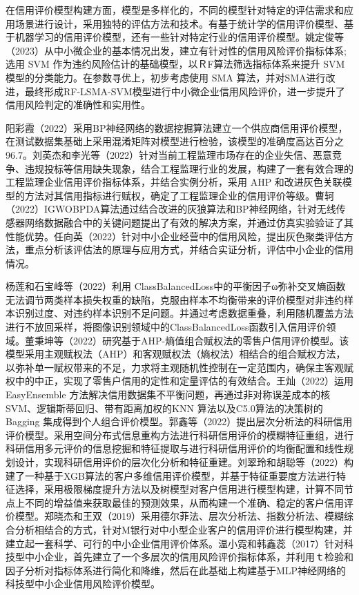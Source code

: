  
在信用评价模型构建方面，模型是多样化的，不同的模型针对特定的评估需求和应用场景进行设计，采用独特的评估方法和技术。有基于统计学的信用评价模型、基于机器学习的信用评价模型，还有一些针对特定行业的信用评价模型。姚定俊等（2023）从中小微企业的基本情况出发，建立有针对性的信用风险评价指标体系; 选用 SVM 作为违约风险估计的基础模型，以ＲF算法筛选指标体系来提升 SVM 模型的分类能力。在参数寻优上，初步考虑使用 SMA 算法，并对SMA进行改进，最终形成RF-LSMA-SVM模型进行中小微企业信用风险评价，进一步提升了信用风险判定的准确性和实用性。

阳彩霞（2022）采用BP神经网络的数据挖掘算法建立一个供应商信用评价模型，在测试数据集基础上采用混淆矩阵对模型进行检验，该模型的准确度高达百分之96.7。刘英杰和李光等（2022）针对当前工程监理市场存在的企业失信、恶意竞争、违规投标等信用缺失现象，结合工程监理行业的发展，构建了一套有效合理的工程监理企业信用评价指标体系，并结合实例分析，采用 AHP 和改进灰色关联模型的方法对其信用指标进行赋权，确定了工程监理企业的信用评价等级。曹轲（2022）IGWOBPDA算法通过结合改进的灰狼算法和BP神经网络，针对无线传感器网络数据融合中的关键问题提出了有效的解决方案，并通过仿真实验验证了其性能优势。任向英（2022）针对中小企业经营中的信用风险，提出灰色聚类评估方法，重点分析该评估法的原理与应用方式，并结合实证分析，评估中小企业的信用情况。

杨莲和石宝峰等（2022）利用 ClassBalancedLoss中的平衡因子ω弥补交叉熵函数无法调节两类样本损失权重的缺陷，克服由样本不均衡带来的评价模型对非违约样本识别过度、对违约样本识别不足问题。并通过考虑数据重叠，利用随机覆盖方法进行不放回采样，将图像识别领域中的ClassBalancedLoss函数引入信用评价领域。董秉坤等（2022）研究基于AHP-熵值组合赋权法的零售户信用评价模型。该模型采用主观赋权法（AHP）和客观赋权法（熵权法）相结合的组合赋权方法，以弥补单一赋权带来的不足，力求将主观随机性控制在一定范围内，确保主客观赋权中的中正，实现了零售户信用的定性和定量评估的有效结合。王灿（2022）运用 EasyEnsemble 方法解决信用数据集不平衡问题，再通过非对称误差成本的核 SVM、逻辑斯蒂回归、带有距离加权的KNN 算法以及C5.0算法的决策树的 Bagging 集成得到个人组合评价模型。郭鑫等（2022）提出层次分析法的科研信用评价模型。采用空间分布式信息重构方法进行科研信用评价的模糊特征重组，进行科研信用多元评价的信息挖掘和特征提取与进行科研信用评价的均衡配置和线性规划设计，实现科研信用评价的层次化分析和特征重建。刘翠玲和胡聪等（2022）构建了一种基于XGB算法的客户多维信用评价模型，并基于特征重要度方法进行特征选择，采用极限梯度提升方法以及树模型对客户信用进行模型构建，计算不同节点上不同的增益值来获取最佳的预测效果，从而构建一个准确、稳定的客户信用评价模型。郑晓杰和王双（2019）采用德尔菲法、层次分析法、指数分析法、模糊综合分析相结合的方式，针对M银行对中小型企业客户的信用评价进行模型构建，并建立起一套科学、可行的中小企业信用评价体系。温小霓和韩鑫蕊（2017）针对科技型中小企业，首先建立了一个多层次的信用风险评价指标体系，并利用ｔ检验和因子分析对指标体系进行简化和降维，然后在此基础上构建基于MLP神经网络的科技型中小企业信用风险评价模型。

